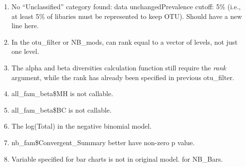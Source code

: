 \documentclass[]{article}
\providecommand{\tightlist}{%
  \setlength{\itemsep}{0pt}\setlength{\parskip}{0pt}}
\begin{document}
\begin{enumerate}
\def\labelenumi{\arabic{enumi}.}
\tightlist
\item
  No ``Unclassified'' category found: data unchangedPrevalence cutoff:
  5\% (i.e., at least 5\% of libaries must be represented to keep OTU).
  Should have a new line here.\\
\item
  In the otu\_filter or NB\_mods, can rank equal to a vector of levels,
  not just one level.\\
\item
  The alpha and beta diversities calculation function still require the
  \emph{rank} argument, while the rank has already been specified in
  previous otu\_filter.\\
\item
  all\_fam\_beta\$MH is not callable.\\
\item
  all\_fam\_beta\$BC is not callable.\\
\item
  The log(Total) in the negative binomial model.\\
\item
  nb\_fam\$Convergent\_Summary better have non-zero p value.\\
\item
  Variable specified for bar charts is not in original model. for
  NB\_Bars.
\end{enumerate}
\end{document}
